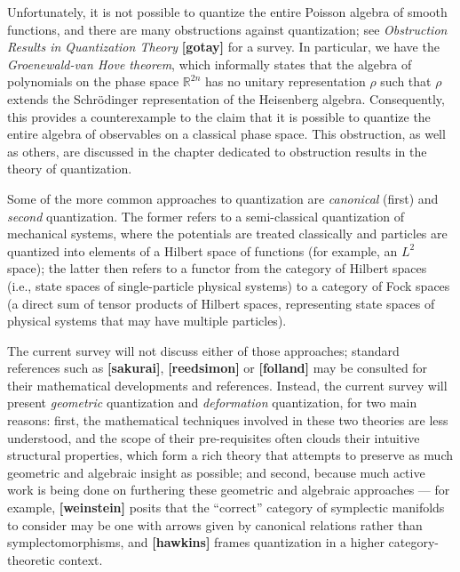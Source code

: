\documentclass{tufte-handout}
\begin{document}
Unfortunately, it is not possible to quantize the entire Poisson algebra of smooth functions, and there are many obstructions against quantization; see \emph{Obstruction Results in Quantization Theory} \textbf{[gotay]} for a survey. In particular, we have the \emph{Groenewald-van Hove theorem}, which informally states that the algebra of polynomials on the phase space $\mathbb{R}^{2n}$ has no unitary representation $\rho$ such that $\rho$ extends the Schr\"{o}dinger representation of the Heisenberg algebra. Consequently, this provides a counterexample to the claim that it is possible to quantize the entire algebra of observables on a classical phase space. This obstruction, as well as others, are discussed in the chapter dedicated to obstruction results in the theory of quantization.

Some of the more common approaches to quantization are \emph{canonical} (first) and \emph{second} quantization. The former refers to a semi-classical quantization of mechanical systems, where the potentials are treated classically and particles are quantized into elements of a Hilbert space of functions (for example, an $L^2$ space); the latter then refers to a functor from the category of Hilbert spaces (i.e., state spaces of single-particle physical systems) to a category of Fock spaces (a direct sum of tensor products of Hilbert spaces, representing state spaces of physical systems that may have multiple particles).

The current survey will not discuss either of those approaches; standard references such as \textbf{[sakurai]}, \textbf{[reedsimon]} or \textbf{[folland]} may be consulted for their mathematical developments and references. Instead, the current survey will present \emph{geometric} quantization and \emph{deformation} quantization, for two main reasons: first, the mathematical techniques involved in these two theories are less understood, and the scope of their pre-requisites often clouds their intuitive structural properties, which form a rich theory that attempts to preserve as much geometric and algebraic insight as possible; and second, because much active work is being done on furthering these geometric and algebraic approaches --- 
for example, \textbf{[weinstein]} posits that the ``correct'' category of symplectic manifolds to consider may be one with arrows given by canonical relations rather than symplectomorphisms, and \textbf{[hawkins]} frames quantization in a higher category-theoretic context.
\end{document}
